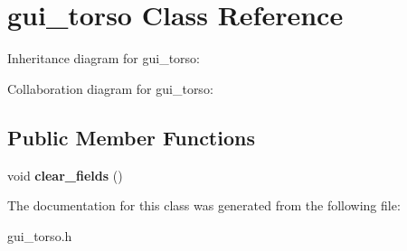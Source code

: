\hypertarget{classgui__torso}{}\section{gui\+\_\+torso Class Reference}
\label{classgui__torso}


Inheritance diagram for gui\+\_\+torso\+:


Collaboration diagram for gui\+\_\+torso\+:
\subsection*{Public Member Functions}
\begin{DoxyCompactItemize}
\item 
void {\bfseries clear\+\_\+fields} ()\hypertarget{classgui__torso_a080b7ad54ff5b6554a07c99fce70d86a}{}\label{classgui__torso_a080b7ad54ff5b6554a07c99fce70d86a}

\end{DoxyCompactItemize}


The documentation for this class was generated from the following file\+:\begin{DoxyCompactItemize}
\item 
gui\+\_\+torso.\+h\end{DoxyCompactItemize}

